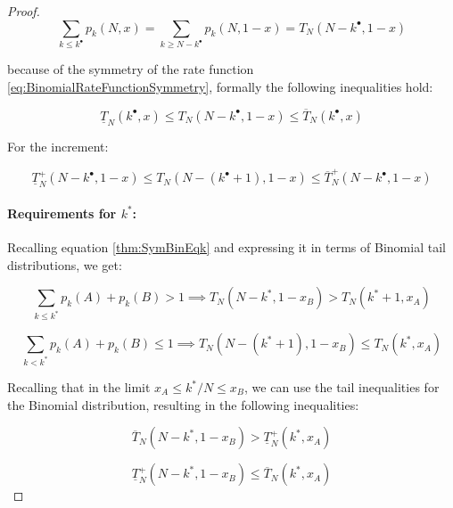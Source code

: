 \documentclass{article}
\theoremstyle{definition}
\begin{document}
\begin{proof}
    \begin{equation}
        \sum_{k\le k^\bullet} p_k(N,x) = 
        \sum_{k\ge N - k^\bullet} p_k(N,1-x) =
        T_N(N-k^\bullet,1-x)
    \end{equation}

    because of the symmetry of the rate function \eqref{eq:BinomialRateFunctionSymmetry}, formally the following inequalities hold:

    \begin{equation}
        \underline{T}_N(k^\bullet,x) 
        \le
        T_N(N-k^\bullet,1-x) 
        \le
        \overline{T}_N(k^\bullet,x)
    \end{equation}

    For the increment:

    \begin{equation}
        \underline{T}^+_N(N-k^\bullet,1-x) 
        \le
        T_N(N-(k^\bullet+1),1-x) 
        \le
        \overline{T}^+_N(N-k^\bullet,1-x)
    \end{equation}

    \paragraph{Requirements for $k^*$:}
    Recalling equation \ref{thm:SymBinEqk} and expressing it in terms of Binomial tail distributions, we get:

    \begin{equation}
        \sum_{k \le k^*} p_k(A)+p_k(B) > 1 \implies
        T_N(N-k^*,1-x_B) > T_N(k^*+1,x_A)
    \end{equation}

    \begin{equation}
        \sum_{k<k^*} p_k(A)+p_k(B) \le 1 \implies
        T_N(N-(k^*+1),1-x_B) \le T_N(k^*,x_A)
    \end{equation}

    Recalling that in the limit $x_A \le k^*/N \le x_B$, we can use the tail inequalities for the Binomial distribution, resulting in the following inequalities: 

    \begin{equation}
        \overline{T}_N(N-k^*,1-x_B) 
        >
        \underline{T}^+_N(k^*,x_A)
    \end{equation}

    \begin{equation}
        \underline{T}^+_N(N-k^*,1-x_B)
        \le
        \overline{T}_N(k^*,x_A) 
    \end{equation}


\end{proof}
\end{document}
